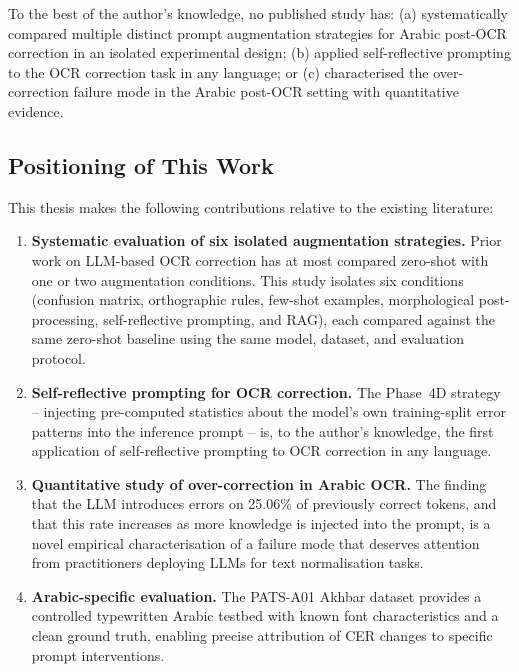 To the best of the author's knowledge, no published study has:
(a) systematically compared multiple distinct prompt augmentation strategies
for Arabic post-OCR correction in an isolated experimental design;
(b) applied self-reflective prompting to the OCR correction task in any language;
or (c) characterised the over-correction failure mode in the Arabic post-OCR
setting with quantitative evidence.

\subsection{Positioning of This Work}
\label{subsec:positioning}

This thesis makes the following contributions relative to the existing literature:

\begin{enumerate}
  \item \textbf{Systematic evaluation of six isolated augmentation strategies.}
        Prior work on LLM-based OCR correction has at most compared zero-shot
        with one or two augmentation conditions.
        This study isolates six conditions (confusion matrix, orthographic rules,
        few-shot examples, morphological post-processing, self-reflective
        prompting, and RAG), each compared against the same zero-shot baseline
        using the same model, dataset, and evaluation protocol.

  \item \textbf{Self-reflective prompting for OCR correction.}
        The Phase~4D strategy -- injecting pre-computed statistics about the
        model's own training-split error patterns into the inference prompt --
        is, to the author's knowledge, the first application of self-reflective
        prompting to OCR correction in any language.

  \item \textbf{Quantitative study of over-correction in Arabic OCR.}
        The finding that the LLM introduces errors on 25.06\% of previously
        correct tokens, and that this rate increases as more knowledge is injected
        into the prompt, is a novel empirical characterisation of a failure mode
        that deserves attention from practitioners deploying LLMs for text
        normalisation tasks.

  \item \textbf{Arabic-specific evaluation.}
        The PATS-A01 Akhbar dataset provides a controlled typewritten Arabic
        testbed with known font characteristics and a clean ground truth, enabling
        precise attribution of CER changes to specific prompt interventions.
\end{enumerate}
